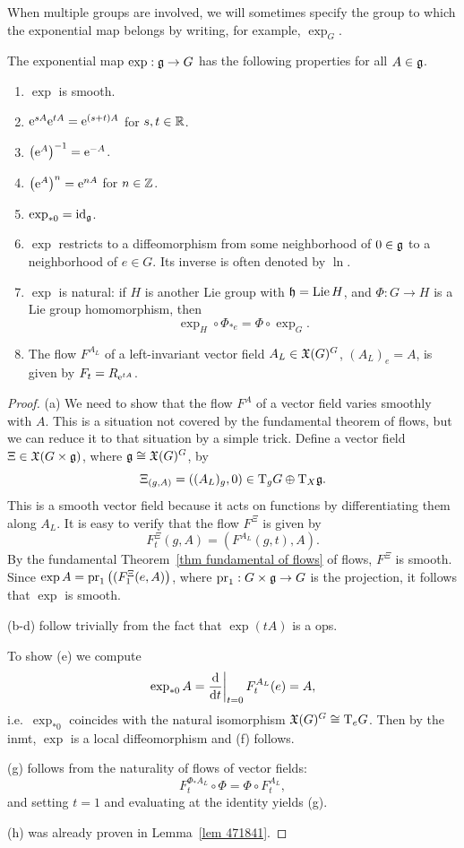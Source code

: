 When multiple groups are involved, we will sometimes specify the group to which the exponential map belongs by writing, for example, $\exp_G$.

\begin{prop}\label{prop properties of exp} The exponential map $\exp:\mathfrak{g}\to G$ has the following properties for all $A\in\mathfrak{g}$.
\begin{enumerate}[label=(\alph*)]
    \item $\exp$ is smooth.
    \item $\mathrm{e}^{sA}\mathrm{e}^{tA}=\mathrm{e}^{(s+t)A}$ for $s,t\in\mathbb{R}$.
    \item $\left(\mathrm{e}^A\right)^{-1}=\mathrm{e}^{-A}$.
    \item $\left(\mathrm{e}^A\right)^{n}=\mathrm{e}^{nA}$ for $n\in \mathbb{Z}$.
    \item $\exp_{\ast 0}=\operatorname{id}_{\mathfrak{g}}$.
    \item $\exp$ restricts to a diffeomorphism from some neighborhood of $0\in \mathfrak{g}$ to a neighborhood of $e\in G$. Its inverse is often denoted by $\ln$.
    \item $\exp$ is natural: if $H$ is another Lie group with $\mathfrak{h}=\operatorname{Lie} H$, and $\Phi:G\to H$ is a Lie group homomorphism, then 
    \[\exp_H\circ\Phi_{\ast e}=\Phi\circ \exp_G.\]
    \item The flow $F^{A_L}$ of a left-invariant vector field $A_L\in \mathfrak{X}(G)^G$, $(A_L)_e=A$, is given by $F_t=R_{\mathrm{e}^{tA}}$.
\end{enumerate}
\end{prop}
\begin{proof}
    (a) We need to show that the flow $F^A$ of a vector field varies smoothly with $A$. This is a situation not covered by the fundamental theorem of flows, but we can reduce it to that situation by a simple trick. Define a vector field $\Xi\in\mathfrak{X}(G\times\mathfrak{g})$, where $\mathfrak{g}\cong \mathfrak{X}(G)^G$, by
    \[\Xi_{(g,A)}=((A_L)_g,0)\in \mathrm{T}_gG\oplus \mathrm{T}_X \mathfrak{g}.\]
    This is a smooth vector field because it acts on functions by differentiating them along $A_L$. It is easy to verify that the flow $F^\Xi$ is given by
    \[F^\Xi_t(g,A)=\left(F^{A_L}(g,t),A\right).\]
    By the fundamental Theorem~\ref{thm fundamental of flows} of flows, $F^\Xi$ is smooth. Since $\exp A=\operatorname{pr}_1\left((F^\Xi_1(e,A)\right)$, where $\operatorname{pr}_1:G\times\mathfrak{g}\to G$ is the projection, it follows that $\exp$ is smooth.

    (b-d) follow trivially from the fact that $\exp(tA)$ is a \gls{ops}.
    
    To show (e) we compute
    \[\exp_{\ast 0}A=\restr{\frac{\dd}{\dd t}}{t=0}F_t^{A_L}(e)=A,\]
    i.e.~$\exp_{\ast 0}$ coincides with the natural isomorphism $\mathfrak{X}(G)^G\cong \mathrm{T}_e G$. Then by the \gls{inmt}, $\exp$ is a local diffeomorphism and (f) follows.

    (g) follows from the naturality of flows of vector fields:
    \[F^{\Phi_\ast A_L}_t\circ \Phi=\Phi\circ F^{A_L}_t,\]
    and setting $t=1$ and evaluating at the identity yields (g).

    (h) was already proven in Lemma~\ref{lem 471841}.
\end{proof}

